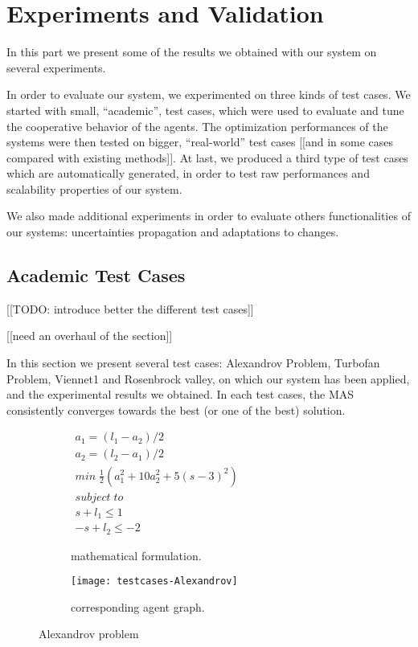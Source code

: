 \part{Experiments and Validation}

In this part we present some of the results we obtained with our system on several experiments.

In order to evaluate our system, we experimented on three kinds of test cases. We started with small, \enquote{academic}, test cases, which were used to evaluate and tune the cooperative behavior of the agents. The optimization performances of the systems were then tested on bigger, \enquote{real-world} test cases [[and in some cases compared with existing methods]]. At last, we produced a third type of test cases which are automatically generated, in order to test raw performances and scalability properties of our system.

We also made additional experiments in order to evaluate others functionalities of our systems: uncertainties propagation and adaptations to changes.

\chapter{Academic Test Cases}

[[TODO: introduce better the different test cases]]

[[need an overhaul of the section]]

In this section we present several test cases: Alexandrov Problem, Turbofan Problem, Viennet1 and Rosenbrock valley, on which our system has been applied, and the experimental results we obtained. In each test cases, the MAS consistently converges towards the best (or one of the best) solution.

\begin{figure}
\centering
	\begin{subfigure}[b]{0.4\textwidth}
		$\begin{array}{c}
			a_1 = (l_1 - a_2)/2 \\
			a_2 = (l_2 - a_1)/2 \\
			min \; \frac{1}{2}(a_1^2 + 10a_2^2 + 5(s-3)^2) \\
			subject \; to \\
			s + l_1 \leq 1 \\
			-s + l_2 \leq -2
		\end{array}$
		\caption{mathematical formulation.}\label{alexandrov:math}
	\end{subfigure}
	\hfill%
	\begin{subfigure}[b]{0.5\textwidth}
		\texttt{[image: testcases-Alexandrov]}%
		\caption{corresponding agent graph.}\label{alexandrov:graph}
	\end{subfigure}
\caption{Alexandrov problem}\label{alexandrov}
\end{figure}

